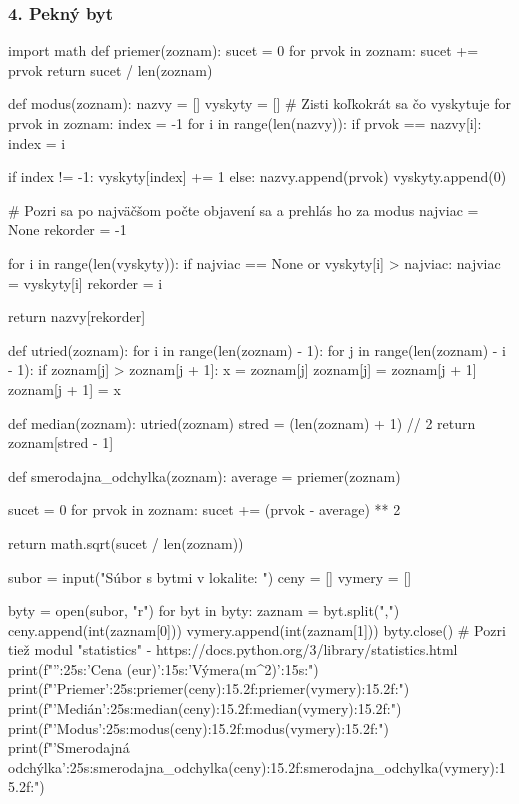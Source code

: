 \subsubsection*{4. Pekný byt}
\begin{solution}
import math
def priemer(zoznam):
    sucet = 0
    for prvok in zoznam:
        sucet += prvok
    return sucet / len(zoznam)

def modus(zoznam):
    nazvy = []
    vyskyty = []
    # Zisti koľkokrát sa čo vyskytuje
    for prvok in zoznam:
        index = -1
        for i in range(len(nazvy)):
            if prvok == nazvy[i]:
                index = i

        if index != -1:
            vyskyty[index] += 1
        else:
            nazvy.append(prvok)
            vyskyty.append(0)

    # Pozri sa po najväčšom počte objavení sa a prehlás ho za modus
    najviac = None
    rekorder = -1

    for i in range(len(vyskyty)):
        if najviac == None or vyskyty[i] > najviac:
            najviac = vyskyty[i]
            rekorder = i

    return nazvy[rekorder]

def utried(zoznam):
    for i in range(len(zoznam) - 1):
        for j in range(len(zoznam) - i - 1):
            if zoznam[j] > zoznam[j + 1]:
                x = zoznam[j]
                zoznam[j] = zoznam[j + 1]
                zoznam[j + 1] = x

def median(zoznam):
    utried(zoznam)
    stred = (len(zoznam) + 1) // 2
    return zoznam[stred - 1]

def smerodajna_odchylka(zoznam):
    average = priemer(zoznam)

    sucet = 0
    for prvok in zoznam:
        sucet += (prvok - average) ** 2

    return math.sqrt(sucet / len(zoznam))

subor = input("Súbor s bytmi v lokalite: ")
ceny = []
vymery = []

byty = open(subor, "r")
for byt in byty:
    zaznam = byt.split(",")
    ceny.append(int(zaznam[0]))
    vymery.append(int(zaznam[1]))
byty.close()
# Pozri tiež modul "statistics" - https://docs.python.org/3/library/statistics.html
print(f"{'':25s}:{'Cena (eur)':15s}:{'Výmera(m^2)':15s}:")
print(f"{'Priemer':25s}:{priemer(ceny):15.2f}:{priemer(vymery):15.2f}:")
print(f"{'Medián':25s}:{median(ceny):15.2f}:{median(vymery):15.2f}:")
print(f"{'Modus':25s}:{modus(ceny):15.2f}:{modus(vymery):15.2f}:")
print(f"{'Smerodajná odchýlka':25s}:{smerodajna_odchylka(ceny):15.2f}:{smerodajna_odchylka(vymery):15.2f}:")
\end{solution}

